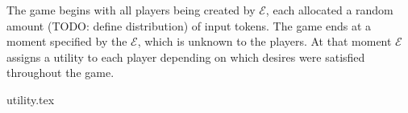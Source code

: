   The game begins with all players being created by $\mathcal{E}$, each allocated a random amount (TODO: define distribution)
  of input tokens. The game ends at a moment specified by the $\mathcal{E}$, which is unknown to the players. At that moment
  $\mathcal{E}$ assigns a utility to each player depending on which desires were satisfied throughout the game.

  {utility.tex}
